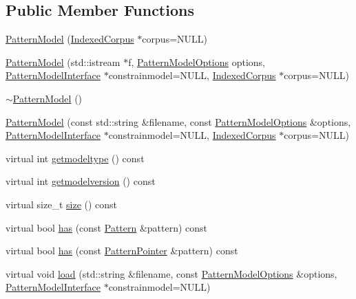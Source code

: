 \subsection*{Public Member Functions}
\begin{DoxyCompactItemize}
\item 
\hyperlink{classPatternModel_afc90f7dd876f3c602348275380503037}{Pattern\+Model} (\hyperlink{classIndexedCorpus}{Indexed\+Corpus} $\ast$corpus=N\+U\+L\+L)
\item 
\hyperlink{classPatternModel_a075916375572bbfb0cf2d22b7bf0c7f9}{Pattern\+Model} (std\+::istream $\ast$f, \hyperlink{classPatternModelOptions}{Pattern\+Model\+Options} options, \hyperlink{classPatternModelInterface}{Pattern\+Model\+Interface} $\ast$constrainmodel=N\+U\+L\+L, \hyperlink{classIndexedCorpus}{Indexed\+Corpus} $\ast$corpus=N\+U\+L\+L)
\item 
\hyperlink{classPatternModel_acf75d6956016d4ba882e9073a42296ac}{$\sim$\+Pattern\+Model} ()
\item 
\hyperlink{classPatternModel_a8252ea7d11076fbf961bb22cf679bacd}{Pattern\+Model} (const std\+::string \&filename, const \hyperlink{classPatternModelOptions}{Pattern\+Model\+Options} \&options, \hyperlink{classPatternModelInterface}{Pattern\+Model\+Interface} $\ast$constrainmodel=N\+U\+L\+L, \hyperlink{classIndexedCorpus}{Indexed\+Corpus} $\ast$corpus=N\+U\+L\+L)
\item 
virtual int \hyperlink{classPatternModel_ac4a38270c6a2dbcfccf0b8baebee11eb}{getmodeltype} () const 
\item 
virtual int \hyperlink{classPatternModel_a760a01e32f97b63400d13e69384dad86}{getmodelversion} () const 
\item 
virtual size\+\_\+t \hyperlink{classPatternModel_a2422cb944da209f399b3b10f3b1d2684}{size} () const 
\item 
virtual bool \hyperlink{classPatternModel_ad2fa89b6a2eb8d2aebb8553a9da42b84}{has} (const \hyperlink{classPattern}{Pattern} \&pattern) const 
\item 
virtual bool \hyperlink{classPatternModel_a3a5098f2c1606c0685ccf97ad9f6cad6}{has} (const \hyperlink{classPatternPointer}{Pattern\+Pointer} \&pattern) const 
\item 
virtual void \hyperlink{classPatternModel_ad9e711b16dc97fe4cb0fe5569b9327e4}{load} (std\+::string \&filename, const \hyperlink{classPatternModelOptions}{Pattern\+Model\+Options} \&options, \hyperlink{classPatternModelInterface}{Pattern\+Model\+Interface} $\ast$constrainmodel=N\+U\+L\+L)
\item 

\end{DoxyCompactItemize}
